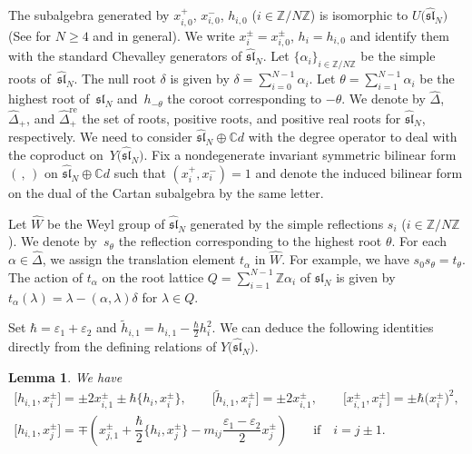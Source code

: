 \documentclass[pdftex]{sigma}
\newtheorem{lem}[thm]{Lemma}
\theoremstyle{definition}
\numberwithin{equation}{section}
\newcommand{\ve}{\varepsilon}
\newcommand{\bbZ}{\mathbb{Z}}
\newcommand{\bbC}{\mathbb{C}}
\newcommand{\affY}{Y\big(\affsl\big)}
\newcommand{\affsl}{\hat{\mathfrak{sl}}_N}
\begin{document}
The subalgebra generated by $x_{i,0}^+$, $x_{i,0}^-$, $h_{i,0}$ ($i \in \bbZ / N\bbZ$) is isomorphic to $U\big(\affsl\big)$ (See \cite[Theorem~6.1]{MR2323534} for $N \geq 4$ and \cite[Theorem~6.9]{GRW} in general). We write $x_{i}^{\pm} = x_{i,0}^{\pm}$, $h_{i} = h_{i,0}$ and identify them with the standard Chevalley generators of $\affsl$. Let $\{\alpha_i\}_{i \in \bbZ/N\bbZ}$ be the simple roots of~$\affsl$. The null root $\delta$ is given by $\delta=\sum\limits_{i=0}^{N-1} \alpha_i$. Let $\theta = \sum\limits_{i=1}^{N-1} \alpha_i$ be the highest root of~$\mathfrak{sl}_N$ and~$h_{-\theta}$ the coroot corresponding to $-\theta$. We denote by $\hat{\Delta}$, $\hat{\Delta}_+$, and $\hat{\Delta}_+^{\mathrm{re}}$ the set of roots, positive roots, and positive real roots for $\affsl$, respectively. We need to consider $\affsl \oplus \bbC d$ with the degree operator to deal with the coproduct on~$\affY$. Fix a nondegenerate invariant symmetric bilinear form $(\, ,\, )$ on $\affsl \oplus \bbC d$ such that $(x_i^+,x_i^-)=1$ and denote the induced bilinear form on the dual of the Cartan subalgebra by the same letter.

Let $\hat{W}$ be the Weyl group of $\affsl$ generated by the simple reflections $s_i$ ($i \in \bbZ/N\bbZ$). We denote by~$s_{\theta}$ the reflection corresponding to the highest root $\theta$. For each $\alpha \in \hat{\Delta}$, we assign the translation element $t_{\alpha}$ in $\hat{W}$. For example, we have $s_0 s_{\theta} = t_{\theta}$. The action of $t_{\alpha}$ on the root lattice $Q=\sum\limits_{i=1}^{N-1} \bbZ \alpha_i$ of $\mathfrak{sl}_N$ is given by $t_{\alpha}(\lambda) = \lambda - (\alpha,\lambda)\delta$ for $\lambda \in Q$.

Set $\hbar = \ve_1 + \ve_2$ and $\tilde{h}_{i,1} = h_{i,1} - \frac{\hbar}{2} h_{i}^2$. We can deduce the following identities directly from the defining relations of $\affY$.
\begin{lem}\label{lem:relations}
We have
\begin{gather*}
\big[h_{i,1}, x_{i}^{\pm}\big] = \pm2 x_{i,1}^{\pm} \pm \hbar \big\{h_i,x_i^{\pm}\big\}, \qquad \big[\tilde{h}_{i,1}, x_{i}^{\pm}\big] = \pm2 x_{i,1}^{\pm}, \qquad \big[x_{i,1}^{\pm},x_i^{\pm}\big] = \pm \hbar \big(x_i^{\pm}\big)^2,\\
\big[h_{i,1}, x_{j}^{\pm}\big] = \mp \left( x_{j,1}^{\pm} + \dfrac{\hbar}{2} \big\{h_i,x_j^{\pm}\big\} - m_{ij} \dfrac{\ve_1-\ve_2}{2}x_j^{\pm} \right) \qquad \text{if} \quad i=j \pm 1.
\end{gather*}
\end{lem}
\end{document}

